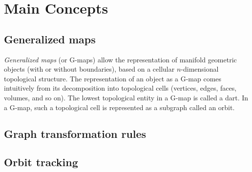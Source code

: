 \section{Main Concepts}



\subsection{Generalized maps}

\emph{Generalized maps} (or G-maps) \cite{lienhardt1991topological,
  Damiand-Lienhardt14} allow the representation of manifold geometric objects
(with or without boundaries), based on a cellular $n$-dimensional topological
structure. %
The representation of an object as a G-map comes intuitively from its
decomposition into topological cells (vertices, edges, faces, volumes, and so
on). The lowest topological entity in a G-map is called a dart. In a G-map, such
a topological cell is represented as a subgraph called an orbit. %

\subsection{Graph transformation rules}



\subsection{Orbit tracking}

